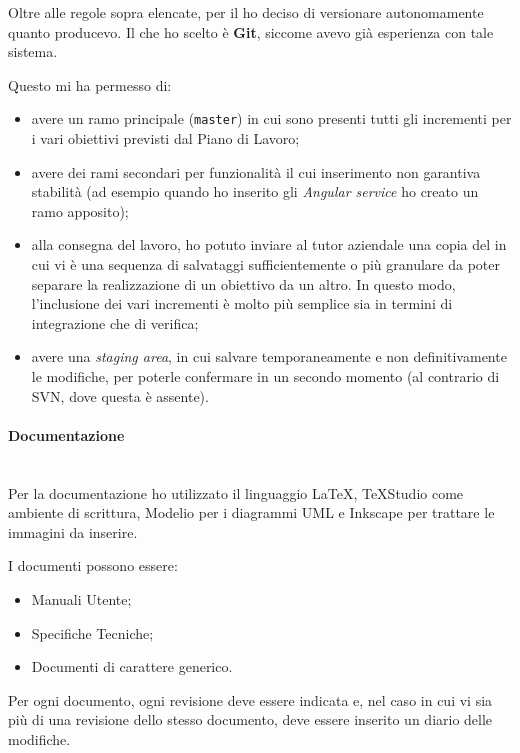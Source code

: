 Oltre alle regole sopra elencate, per il \FREND{} ho deciso di versionare
autonomamente quanto producevo. Il  che ho scelto è \textbf{Git},
siccome avevo già esperienza con tale sistema.

Questo mi ha permesso di:

\begin{itemize}
\item avere un ramo principale (\texttt{master}) in cui sono presenti tutti
  gli incrementi per i vari obiettivi previsti dal Piano di Lavoro;
\item avere dei rami secondari per funzionalità il cui inserimento non
  garantiva stabilità (ad esempio quando ho inserito gli
  \emph{Angular service} ho creato un ramo apposito);
\item alla consegna del lavoro, ho potuto inviare al tutor aziendale una copia
  del  in cui vi è una sequenza di salvataggi
  sufficientemente o più granulare da poter separare la realizzazione di un
  obiettivo da un altro. In questo modo, l'inclusione dei vari
  incrementi è molto più semplice sia in termini di integrazione che di
  verifica;
\item avere una \emph{staging area}, in cui salvare temporaneamente e non
  definitivamente le modifiche, per poterle confermare in un secondo momento
  (al contrario di SVN, dove questa è assente).
\end{itemize}

\paragraph{Documentazione} \mbox{} \\

Per la documentazione ho utilizzato il linguaggio \LaTeX{}, \TeX{}Studio come
ambiente di scrittura, Modelio per i diagrammi UML e Inkscape per trattare le
immagini da inserire.

I documenti possono essere:

\begin{itemize}
\item Manuali Utente;
\item Specifiche Tecniche;
\item Documenti di carattere generico.
\end{itemize}

Per ogni documento, ogni revisione deve essere indicata e, nel caso in cui vi
sia più di una revisione dello stesso documento, deve essere inserito un
diario delle modifiche.

